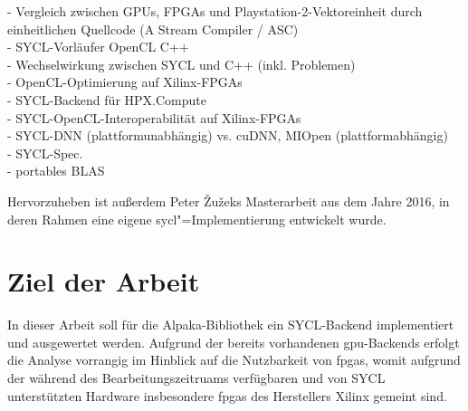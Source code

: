\cite{howes2006} - Vergleich zwischen GPUs, FPGAs und Playstation-2-Vektoreinheit durch einheitlichen Quellcode (A Stream Compiler / ASC) \\
\cite{gaster2013} - SYCL-Vorläufer OpenCL C++ \\
\cite{wong2016} - Wechselwirkung zwischen SYCL und C++ (inkl. Problemen) \\
\cite{fifield2016} - OpenCL-Optimierung auf Xilinx-FPGAs \\
\cite{copik2017} - SYCL-Backend für HPX.Compute\\
\cite{doumoulakis2017} - SYCL-OpenCL-Interoperabilität auf Xilinx-FPGAs \\
\cite{burns2019} - SYCL-DNN (plattformunabhängig) vs. cuDNN, MIOpen (plattformabhängig) \\
\cite{sycl2019} - SYCL-Spec.\\
\cite{rodriguez-gutiez2019} - portables BLAS

Hervorzuheben ist außerdem Peter Žužeks Masterarbeit aus dem Jahre 2016, in
deren Rahmen eine eigene \gls{sycl}"=Implementierung entwickelt wurde. \cite{zuzek2016}

\section{Ziel der Arbeit}\label{einleitung:ziel}

In dieser Arbeit soll für die Alpaka-Bibliothek ein SYCL-Backend implementiert
und ausgewertet werden. Aufgrund der bereits vorhandenen \gls{gpu}-Backends
erfolgt die Analyse vorrangig im Hinblick auf die Nutzbarkeit von \gls{fpga}s,
womit aufgrund der während des Bearbeitungszeitruams verfügbaren und von SYCL
unterstützten Hardware insbesondere \gls{fpga}s des Herstellers Xilinx gemeint
sind.
